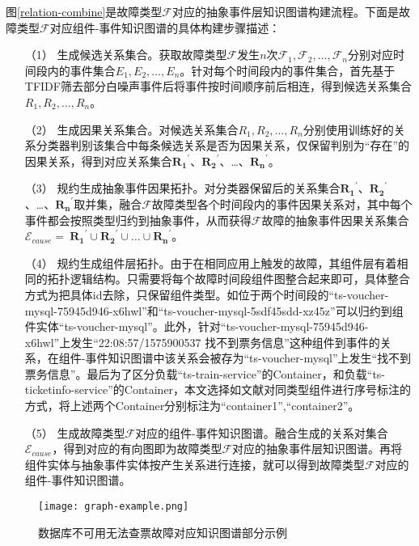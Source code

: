 图\ref{relation-combine}是故障类型$\mathcal{F}$对应的抽象事件层知识图谱构建流程。下面是故障类型$\mathcal{F}$对应组件-事件知识图谱的具体构建步骤描述：
\begin{itemize}
    \item [（1）] 
    生成候选关系集合。获取故障类型$\mathcal{F}$发生$n$次$\mathcal{F}_1,\mathcal{F}_2,…,\mathcal{F}_n$分别对应时间段内的事件集合$E_1,E_2,…,E_n$。针对每个时间段内的事件集合，首先基于TFIDF\cite{joachims1996probabilistic}筛去部分白噪声事件后将事件按时间顺序前后相连，得到候选关系集合$R_1,R_2,…,R_n$。  
    \item [（2）]
    生成因果关系集合。对候选关系集合$R_1,R_2,…,R_n$分别使用训练好的关系分类器判别该集合中每条候选关系是否为因果关系，仅保留判别为“存在”的因果关系，得到对应关系集合${\mathbf{R}_\mathbf{1}}^\prime$、${\mathbf{R}_\mathbf{2}}^\prime$、…、${\mathbf{R}_\mathbf{n}}^\prime$。
    \item [（3）]
    规约生成抽象事件因果拓扑。对分类器保留后的关系集合${\mathbf{R}_\mathbf{1}}^\prime$、${\mathbf{R}_\mathbf{2}}^\prime$、…、${\mathbf{R}_\mathbf{n}}^\prime$取并集，融合$\mathcal{F}$故障类型各个时间段内的事件因果关系对，其中每个事件都会按照类型归约到抽象事件，从而获得$\mathcal{F}$故障的抽象事件因果关系集合$\mathcal{E}_{cause}=\ {\mathbf{R}_\mathbf{1}}^\prime\cup{\mathbf{R}_\mathbf{2}}^\prime\cup\ldots\cup{\mathbf{R}_\mathbf{n}}^\prime$。
    \item [（4）]
    规约生成组件层拓扑。由于在相同应用上触发的故障，其组件层有着相同的拓扑逻辑结构。只需要将每个故障时间段组件图整合起来即可，具体整合方式为把具体id去除，只保留组件类型。如位于两个时间段的“ts-voucher-mysql-75945d946-x6hwl”和“ts-voucher-mysql-5sdf45sdd-xz45z”可以归约到组件实体“ts-voucher-mysql”。此外，针对“ts-voucher-mysql-75945d946-x6hwl”上发生“22:08:57/1575900537 找不到票务信息”这种组件到事件的关系，在组件-事件知识图谱中该关系会被存为“ts-voucher-mysql”上发生“找不到票务信息”。最后为了区分负载“ts-train-service”的Container，和负载“ts-ticketinfo-service”的Container，本文选择如文献\parencite{qiu2020causality-mining-knowledge-graph}对同类型组件进行序号标注的方式，将上述两个Container分别标注为“container1”,“container2”。
    \item [（5）]
    生成故障类型$\mathcal{F}$对应的组件-事件知识图谱。融合生成的关系对集合$\mathcal{E}_{cause}$，得到对应的有向图即为故障类型$\mathcal{F}$对应的抽象事件层知识图谱。再将组件实体与抽象事件实体按产生关系进行连接，就可以得到故障类型$\mathcal{F}$对应的组件-事件知识图谱。
  \end{itemize}

\begin{figure}[htbp]
    \centering
    \texttt{[image: graph-example.png]}
    \caption{数据库不可用无法查票故障对应知识图谱部分示例\label{graph-example}}
\end{figure}

